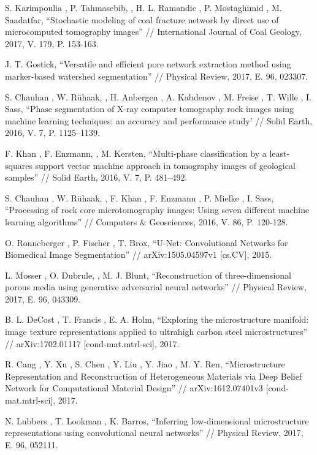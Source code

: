 \documentclass[12pt, a4paper]{extarticle}
\begin{document}
\begin{thebibliography}{99}

 S. Karimpoulia
	, P. Tahmasebib,
	, H. L. Ramandic
	, P. Mostaghimid
	, M. Saadatfar, 
	``Stochastic modeling of coal fracture network by direct use of microcomputed
tomography images'' // International Journal of Coal Geology, 2017, V. 179, P. 153-163.

 J. T. Gostick, 
	``Versatile and efficient pore network extraction method using marker-based watershed segmentation'' // Physical Review, 2017, E. 96, 023307.

 S. Chauhan
	, W. Rühaak,
	, H. Anbergen
	, A. Kabdenov
	, M. Freise
	, T. Wille
	, I. Sass,
	``Phase segmentation of X-ray computer tomography rock images
using machine learning techniques: an accuracy
and performance study' // Solid Earth, 2016, V. 7, P. 1125–1139.
	
 F. Khan
	, F. Enzmann,
	, M. Kersten, 
	``Multi-phase classification by a least-squares support vector machine
approach in tomography images of geological samples'' // Solid Earth, 2016, V. 7, P. 481–492.

 S. Chauhan
	, W. Rühaak,
	, F. Khan
	, F. Enzmann
	, P. Mielke
	, I. Sass,
	``Processing of rock core microtomography images: Using seven
different machine learning algorithms'' // Computers \& Geosciences, 2016, V. 86, P. 120-128.

 O. Ronneberger
	, P. Fischer
	, T. Brox,
	``U-Net: Convolutional Networks for Biomedical
Image Segmentation'' // arXiv:1505.04597v1 [cs.CV], 2015.

 L. Mosser
	, O. Dubrule,
	, M. J. Blunt, 
	``Reconstruction of three-dimensional porous media
using generative adversarial neural networks'' //  
Physical Review, 2017, E. 96, 043309.

 B. L. DeCost
	, T. Francis
	, E. A. Holm, 
	``Exploring the microstructure manifold: image
texture representations applied to ultrahigh 
carbon steel microstructures'' // 
arXiv:1702.01117 [cond-mat.mtrl-sci], 2017.

 R. Cang
	, Y. Xu
	, S. Chen
	, Y. Liu
	, Y. Jiao
	, M. Y. Ren,
	``Microstructure Representation and
Reconstruction of Heterogeneous Materials via
Deep Belief Network for Computational Material 
Design'' // arXiv:1612.07401v3 [cond-mat.mtrl-sci],  2017.

 N. Lubbers
	, T. Lookman
	, K. Barros,
	``Inferring low-dimensional microstructure representations using
convolutional neural networks'' //  Physical Review, 2017, E. 96, 052111.


\end{thebibliography}
\end{document}
